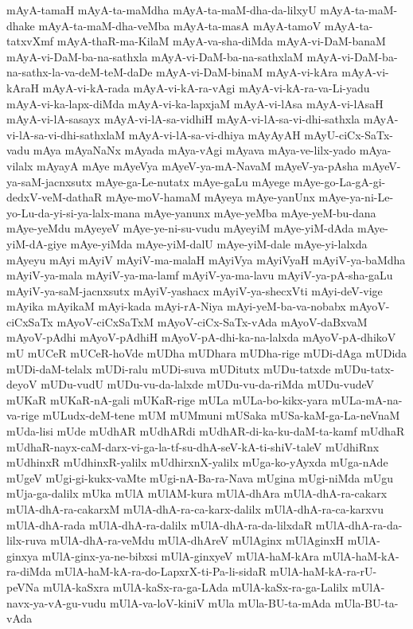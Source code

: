 {mAyA-tamaH
mAyA-ta-maMdha
mAyA-ta-maM-dha-da-lilxyU
mAyA-ta-maM-dhake
mAyA-ta-maM-dha-veMba
mAyA-ta-masA
mAyA-tamoV
mAyA-ta-tatxvXmf
mAyA-thaR-ma-KilaM
mAyA-va-sha-diMda
mAyA-vi-DaM-banaM
mAyA-vi-DaM-ba-na-sathxla
mAyA-vi-DaM-ba-na-sathxlaM
mAyA-vi-DaM-ba-na-sathx-la-va-deM-teM-daDe
mAyA-vi-DaM-binaM
mAyA-vi-kAra
mAyA-vi-kAraH
mAyA-vi-kA-rada
mAyA-vi-kA-ra-vAgi
mAyA-vi-kA-ra-va-Li-yadu
mAyA-vi-ka-lapx-diMda
mAyA-vi-ka-lapxjaM
mAyA-vi-lAsa
mAyA-vi-lAsaH
mAyA-vi-lA-sasayx
mAyA-vi-lA-sa-vidhiH
mAyA-vi-lA-sa-vi-dhi-sathxla
mAyA-vi-lA-sa-vi-dhi-sathxlaM
mAyA-vi-lA-sa-vi-dhiya
mAyAyAH
mAyU-ciCx-SaTx-vadu
mAya
mAyaNaNx
mAyada
mAya-vAgi
mAyava
mAya-ve-lilx-yado
mAya-vilalx
mAyayA
mAye
mAyeVya
mAyeV-ya-mA-NavaM
mAyeV-ya-pAsha
mAyeV-ya-saM-jacnxsutx
mAye-ga-Le-nutatx
mAye-gaLu
mAyege
mAye-go-La-gA-gi-dedxV-veM-dathaR
mAye-moV-hamaM
mAyeya
mAye-yanUnx
mAye-ya-ni-Le-yo-Lu-da-yi-si-ya-lalx-mana
mAye-yanunx
mAye-yeMba
mAye-yeM-bu-dana
mAye-yeMdu
mAyeyeV
mAye-ye-ni-su-vudu
mAyeyiM
mAye-yiM-dAda
mAye-yiM-dA-giye
mAye-yiMda
mAye-yiM-dalU
mAye-yiM-dale
mAye-yi-lalxda
mAyeyu
mAyi
mAyiV
mAyiV-ma-malaH
mAyiVya
mAyiVyaH
mAyiV-ya-baMdha
mAyiV-ya-mala
mAyiV-ya-ma-lamf
mAyiV-ya-ma-lavu
mAyiV-ya-pA-sha-gaLu
mAyiV-ya-saM-jacnxsutx
mAyiV-yashacx
mAyiV-ya-shecxVti
mAyi-deV-vige
mAyika
mAyikaM
mAyi-kada
mAyi-rA-Niya
mAyi-yeM-ba-va-nobabx
mAyoV-ciCxSaTx
mAyoV-ciCxSaTxM
mAyoV-ciCx-SaTx-vAda
mAyoV-daBxvaM
mAyoV-pAdhi
mAyoV-pAdhiH
mAyoV-pA-dhi-ka-na-lalxda
mAyoV-pA-dhikoV
mU
mUCeR
mUCeR-hoVde
mUDha
mUDhara
mUDha-rige
mUDi-dAga
mUDida
mUDi-daM-telalx
mUDi-ralu
mUDi-suva
mUDitutx
mUDu-tatxde
mUDu-tatx-deyoV
mUDu-vudU
mUDu-vu-da-lalxde
mUDu-vu-da-riMda
mUDu-vudeV
mUKaR
mUKaR-nA-gali
mUKaR-rige
mULa
mULa-bo-kikx-yara
mULa-mA-na-va-rige
mULudx-deM-tene
mUM
mUMmuni
mUSaka
mUSa-kaM-ga-La-neVnaM
mUda-lisi
mUde
mUdhAR
mUdhARdi
mUdhAR-di-ka-ku-daM-ta-kamf
mUdhaR
mUdhaR-nayx-caM-darx-vi-ga-la-tf-su-dhA-seV-kA-ti-shiV-taleV
mUdhiRnx
mUdhinxR
mUdhinxR-yalilx
mUdhirxnX-yalilx
mUga-ko-yAyxda
mUga-nAde
mUgeV
mUgi-gi-kukx-vaMte
mUgi-nA-Ba-ra-Nava
mUgina
mUgi-niMda
mUgu
mUja-ga-dalilx
mUka
mUlA
mUlAM-kura
mUlA-dhAra
mUlA-dhA-ra-cakarx
mUlA-dhA-ra-cakarxM
mUlA-dhA-ra-ca-karx-dalilx
mUlA-dhA-ra-ca-karxvu
mUlA-dhA-rada
mUlA-dhA-ra-dalilx
mUlA-dhA-ra-da-lilxdaR
mUlA-dhA-ra-da-lilx-ruva
mUlA-dhA-ra-veMdu
mUlA-dhAreV
mUlAginx
mUlAginxH
mUlA-ginxya
mUlA-ginx-ya-ne-bibxsi
mUlA-ginxyeV
mUlA-haM-kAra
mUlA-haM-kA-ra-diMda
mUlA-haM-kA-ra-do-LapxrX-ti-Pa-li-sidaR
mUlA-haM-kA-ra-rU-peVNa
mUlA-kaSxra
mUlA-kaSx-ra-ga-LAda
mUlA-kaSx-ra-ga-Lalilx
mUlA-navx-ya-vA-gu-vudu
mUlA-va-loV-kiniV
mUla
mUla-BU-ta-mAda
mUla-BU-ta-vAda
}
